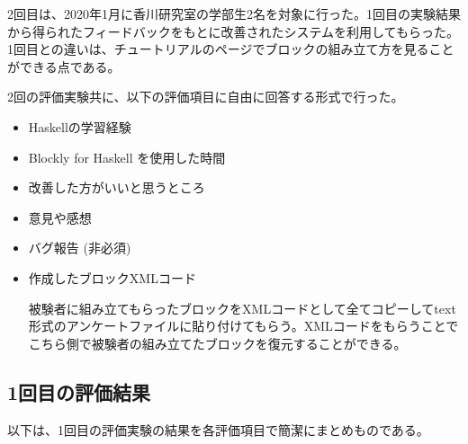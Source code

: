 \documentclass{risepaper}
\begin{document}
2回目は、2020年1月に香川研究室の学部生2名を対象に行った。1回目の実験結果から得られたフィードバックをもとに改善されたシステムを利用してもらった。1回目との違いは、チュートリアルのページでブロックの組み立て方を見ることができる点である。

2回の評価実験共に、以下の評価項目に自由に回答する形式で行った。

\begin{itemize}
\item Haskellの学習経験
\item Blockly for Haskell を使用した時間
\item 改善した方がいいと思うところ
\item 意見や感想
\item バグ報告 (非必須)
\item 作成したブロックXMLコード

被験者に組み立てもらったブロックをXMLコードとして全てコピーしてtext形式のアンケートファイルに貼り付けてもらう。XMLコードをもらうことでこちら側で被験者の組み立てたブロックを復元することができる。
\end{itemize} 

		\subsection{1回目の評価結果}

以下は、1回目の評価実験の結果を各評価項目で簡潔にまとめものである。
\end{document}
